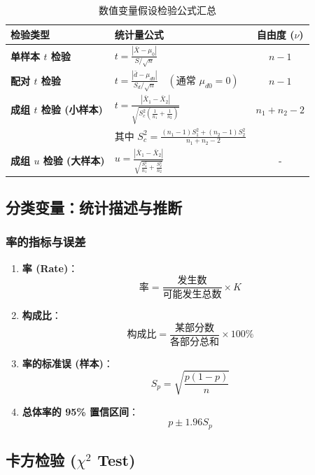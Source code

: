 \documentclass[lang=cn,10pt]{elegantbook}
\begin{document}
\begin{table}[htbp]
    \centering
    \small
    \caption{数值变量假设检验公式汇总}
    \begin{tabular}{llc}
        \toprule
        \textbf{检验类型} & \textbf{统计量公式} & \textbf{自由度 ($\nu$)} \\
        \midrule
        \textbf{单样本 $t$ 检验} & $\displaystyle t = \frac{|\bar{X} - \mu_0|}{S/\sqrt{n}}$ & $n-1$ \\[1em]
        \textbf{配对 $t$ 检验} & $\displaystyle t = \frac{|\bar{d} - \mu_{d0}|}{S_d/\sqrt{n}} \quad (\text{通常 } \mu_{d0}=0)$ & $n-1$ \\[1em]
        \textbf{成组 $t$ 检验 (小样本)} & $\displaystyle t = \frac{|\bar{X}_1 - \bar{X}_2|}{\sqrt{S_c^2(\frac{1}{n_1}+\frac{1}{n_2})}}$ & $n_1+n_2-2$ \\
        & 其中 $\displaystyle S_c^2 = \frac{(n_1-1)S_1^2 + (n_2-1)S_2^2}{n_1+n_2-2}$ & \\[1em]
        \textbf{成组 $u$ 检验 (大样本)} & $\displaystyle u = \frac{|\bar{X}_1 - \bar{X}_2|}{\sqrt{\frac{S_1^2}{n_1} + \frac{S_2^2}{n_2}}}$ & - \\
        \bottomrule
    \end{tabular}
\end{table}

\subsection{分类变量：统计描述与推断}

\subsubsection{率的指标与误差}
\begin{enumerate}
    \item \textbf{率 (Rate)}：
    \[ \text{率} = \frac{\text{发生数}}{\text{可能发生总数}} \times K \]
    \item \textbf{构成比}：
    \[ \text{构成比} = \frac{\text{某部分数}}{\text{各部分总和}} \times 100\% \]
    \item \textbf{率的标准误 (样本)}：
    \[ S_p = \sqrt{\frac{p(1-p)}{n}} \]
    \item \textbf{总体率的 95\% 置信区间}：
    \[ p \pm 1.96 S_p \]
\end{enumerate}

\subsection{卡方检验 ($\chi^2$ Test)}
\end{document}
